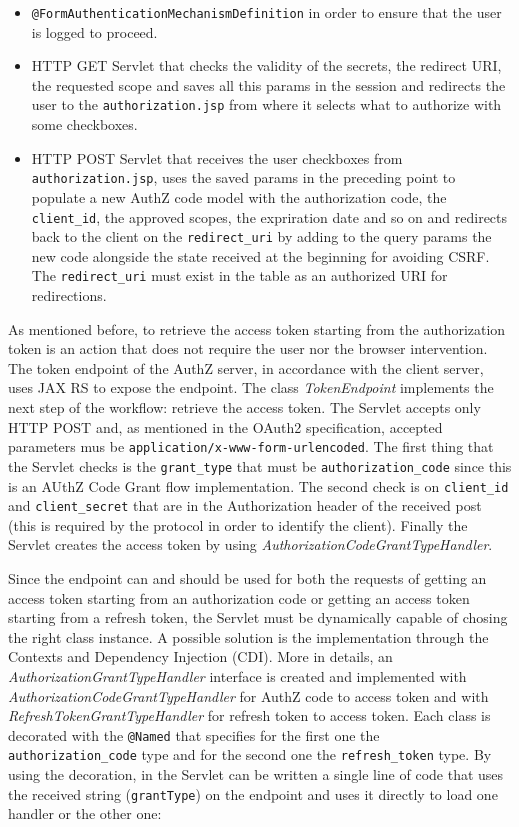 \begin{itemize}
    \item \texttt{@FormAuthenticationMechanismDefinition} in order to ensure that the user is logged to proceed.
    \item HTTP GET Servlet that checks the validity of the secrets, the redirect URI, the requested scope and saves all this params in the session and redirects the user to the \texttt{authorization.jsp} from where it selects what to authorize with some checkboxes.
    \item HTTP POST Servlet that receives the user checkboxes from \texttt{authorization.jsp}, uses the saved params in the preceding point to populate a new AuthZ code model with the authorization code, the \texttt{client\_id}, the approved scopes, the expriration date and so on and redirects back to the client on the \texttt{redirect\_uri} by adding to the query params the new code alongside the state received at the beginning for avoiding CSRF. The \texttt{redirect\_uri} must exist in the table as an authorized URI for redirections.
\end{itemize}

\noindent As mentioned before, to retrieve the access token starting from the authorization token is an action that does not require the user nor the browser intervention. The token endpoint of the AuthZ server, in accordance with the client server, uses JAX RS to expose the endpoint. The class \textit{TokenEndpoint} implements the next step of the workflow: retrieve the access token. The Servlet accepts only HTTP POST and, as mentioned in the OAuth2 specification, accepted parameters mus be \texttt{application/x-www-form-urlencoded}. The first thing that the Servlet checks is the \texttt{grant\_type} that must be \texttt{authorization\_code} since this is an AUthZ Code Grant flow implementation. The second check is on \texttt{client\_id} and \texttt{client\_secret} that are in the Authorization header of the received post (this is required by the protocol in order to identify the client). Finally the Servlet creates the access token by using \textit{AuthorizationCodeGrantTypeHandler}. 

Since the endpoint can and should be used for both the requests of getting an access token starting from an authorization code or getting an access token starting from a refresh token, the Servlet must be dynamically capable of chosing the right class instance. A possible solution is the implementation through the Contexts and Dependency Injection (CDI). More in details, an \textit{AuthorizationGrantTypeHandler} interface is created and implemented with \textit{AuthorizationCodeGrantTypeHandler} for AuthZ code to access token and with \textit{RefreshTokenGrantTypeHandler} for refresh token to access token. Each class is decorated with the \texttt{@Named} that specifies for the first one the \texttt{authorization\_code} type and for the second one the \texttt{refresh\_token} type. By using the decoration, in the Servlet can be written a single line of code that uses the received string (\texttt{grantType}) on the endpoint and uses it directly to load one handler or the other one:


